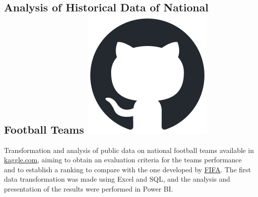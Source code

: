 

\subsection{Analysis of Historical Data of National Football Teams 
\hspace{0.1 cm} \href{https://github.com/juanjogervasio/Data-Analytics-Coderhouse}{\includegraphics[scale=0.2]{github-mark.png}}
}
Transformation and analysis of public data on national football teams available in \href{https://www.kaggle.com/datasets/martj42/international-football-results-from-1872-to-2017}{kaggle.com}, aiming to obtain an evaluation criteria for the teams performance and to establish a ranking to compare with the one developed by \href{https://www.kaggle.com/datasets/cashncarry/fifaworldranking}{FIFA}. The first data transformation was made using Excel and SQL, and the analysis and presentation of the results were performed in Power BI.

\vspace{0.1 cm}

